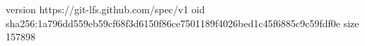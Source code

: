version https://git-lfs.github.com/spec/v1
oid sha256:1a796dd559eb59cf68f3d6150f86ce7501189f4026bed1c45f6885c9c59fdf0e
size 157898
